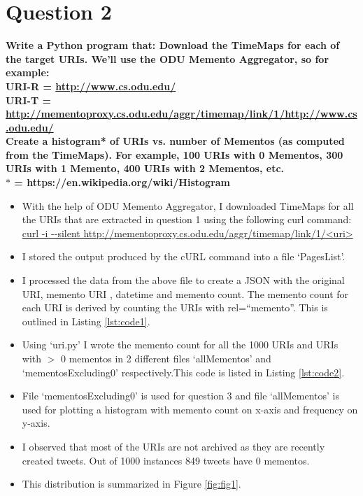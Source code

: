 \chapter{Question 2}
\label{avoiding-uri-aliases} 

\textbf{Write a Python program that:
Download the TimeMaps for each of the target URIs.  We'll use the ODU Memento Aggregator, so for example:}\\
\textbf{URI-R = {\url{http://www.cs.odu.edu/}}\\
URI-T = {\url{http://mementoproxy.cs.odu.edu/aggr/timemap/link/1/http://www.cs.odu.edu/}}\\
Create a histogram* of URIs vs. number of Mementos (as computed from the TimeMaps).  For example, 100 URIs with 0 Mementos, 300 URIs with 1 Memento, 400 URIs with 2 Mementos, etc.}\\
\textbf{$*$ = https://en.wikipedia.org/wiki/Histogram}

\begin{itemize}
\item With the help of ODU Memento Aggregator, I downloaded TimeMaps for all the URIs that are extracted in question 1 using the following curl command:\\
{\url {curl -i --silent http://mementoproxy.cs.odu.edu/aggr/timemap/link/1/<uri>}}
\item  I stored the output produced by the cURL command into a file `PagesList'. 
\item I processed the data from the above file to create a JSON with the original URI, memento URI , datetime and memento count. The memento count for each URI is derived by counting the URIs with rel=``memento''. This is outlined in Listing \ref{lst:code1}.
\item Using `uri.py' I wrote the memento count for all the 1000 URIs and URIs with $>$ 0 mementos in 2 different files `allMementos' and `mementosExcluding0' respectively.This code is listed in Listing \ref{lst:code2}.
\item File `mementosExcluding0' is used for question 3 and file `allMementos' is used for plotting a histogram with memento count on x-axis and frequency on y-axis.
\item I observed that most of the URIs are not archived as they are recently created tweets. Out of 1000 instances 849 tweets have 0 mementos.
\item This distribution is summarized in Figure \ref{fig:fig1}.
\end{itemize}

